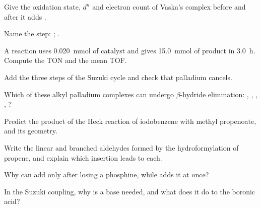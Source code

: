 \begin{exercise}[$\star$]\label{exo:b2:catalytic-cycles:1}
Give the oxidation state, $d^n$ and electron count of Vaska's complex
 before and after it adds .
\end{exercise}

\begin{exercise}[$\star$]\label{exo:b2:catalytic-cycles:2}
Name the step: ; .
\end{exercise}

\begin{exercise}[$\star$]\label{exo:b2:catalytic-cycles:3}
A reaction uses \qty{0.020}{mmol} of catalyst and gives \qty{15.0}{mmol} of product in
\qty{3.0}{h}. Compute the TON and the mean TOF.
\end{exercise}

\begin{exercise}[$\star$]\label{exo:b2:catalytic-cycles:4}
Add the three steps of the Suzuki cycle and check that palladium cancels.
\end{exercise}

\begin{exercise}[$\star\star$]\label{exo:b2:catalytic-cycles:5}
Which of these alkyl palladium complexes can undergo $\beta$-hydride elimination:
, , , , ?
\end{exercise}

\begin{exercise}[$\star\star$]\label{exo:b2:catalytic-cycles:6}
Predict the product of the Heck reaction of iodobenzene with methyl propenoate, and its
geometry.
\end{exercise}

\begin{exercise}[$\star\star$]\label{exo:b2:catalytic-cycles:7}
Write the linear and branched aldehydes formed by the hydroformylation of propene, and
explain which insertion leads to each.
\end{exercise}

\begin{exercise}[$\star\star$]\label{exo:b2:catalytic-cycles:8}
Why can  add  only after losing a phosphine, while
 adds it at once?
\end{exercise}

\begin{exercise}[$\star\star$]\label{exo:b2:catalytic-cycles:9}
In the Suzuki coupling, why is a base needed, and what does it do to the boronic acid?
\end{exercise}


